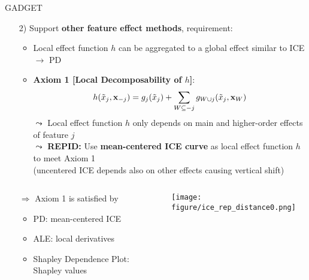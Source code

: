 \documentclass[11pt,compress,t,notes=noshow, aspectratio=169, xcolor=table,dvipsnames]{beamer}
\begin{document}
\begin{frame}{GADGET}
\begin{itemize}
    \item[2)] Support \textbf{other feature effect methods}, requirement:
    \begin{itemize}
        \item Local effect function $h$ can be aggregated to a global effect similar to ICE $\rightarrow$ PD
        \item \textbf{Axiom 1 [Local Decomposability of $h$]}:
        $$h(\tilde x_j, \mathbf{x}_{-j}) = g_j(\tilde x_j) +  \sum\limits_{\substack{W \subseteq -j}} g_{W \cup j}(\tilde x_j,\mathbf{x}_W)$$
        $\leadsto$ Local effect function $h$ only depends on main and higher-order effects of feature $j$ \\
        \pause
        $\leadsto$ \textbf{REPID:} Use \textbf{mean-centered ICE curve} as local effect function $h$ to meet Axiom 1 \\
        \phantom{$\leadsto$ }(uncentered ICE depends also on other effects causing vertical shift)

    \end{itemize}
    \end{itemize}    


 \begin{columns}[T, totalwidth=\textwidth]
        \begin{column}{0.38\textwidth}
                \begin{itemize}
            \item[$\Rightarrow$] Axiom 1 is satisfied by %

            \begin{itemize}
            \item PD: mean-centered ICE
            \item ALE: local derivatives
            \item Shapley Dependence Plot: Shapley values
        \end{itemize}
        \end{itemize}
        \end{column}
                \begin{column}{0.61\textwidth}
    \texttt{[image: figure/ice\_rep\_distance0.png]}
        \end{column}
    \end{columns}
    
\end{frame} 
\end{document}
